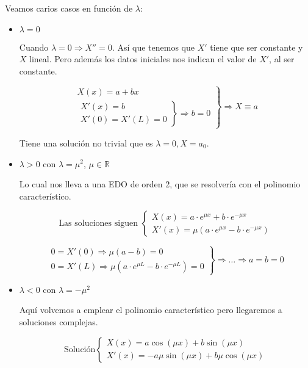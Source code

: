 \begin{example}
		Veamos carios casos en función de $\lambda$:

		\begin{itemize}
			\item $\lambda = 0$

				Cuando $\lambda = 0 \Rightarrow X'' = 0$. Así que tenemos que $X'$ tiene que ser constante y $X$ lineal. Pero además los datos iniciales nos indican el valor de $X'$, al ser constante.

				\[ \left.
				\begin{array}{l}
					X(x) = a + bx \\
					\left.
					\begin{array}{r}
						X'(x) = b \\
						X'(0) = X'(L) = 0
					\end{array} \right\} \Rightarrow b = 0
				\end{array} \right\} \Rightarrow X \equiv a \]

				Tiene una solución no trivial que es $\lambda = 0, X=a_0$.

			\item $\lambda > 0$ con $\lambda = \mu^2$, $\mu \in \mathbb{R}$

				Lo cual nos lleva a una EDO de orden 2, que se resolvería con el polinomio característico.

				\[ \text{Las soluciones siguen } \left\{
				   \begin{array}{l}
				   	X(x) = a \cdot e^{\mu x} + b \cdot e^{-\mu x} \\
				   	X'(x) = \mu (a\cdot e^{\mu x} - b\cdot e^{-\mu x})
				   \end{array} \right.
				\]

				\[ \left. \begin{array}{l}
					0 = X'(0) \Rightarrow \mu(a - b) = 0 \\
					0 = X'(L) \Rightarrow \mu(a \cdot e^{\mu L} - b \cdot e^{-\mu L}) = 0
				\end{array} \right\}
					\Rightarrow … \Rightarrow a = b = 0
				\]


			\item $\lambda < 0$ con $\lambda = - \mu^2$

				Aquí volvemos a emplear el polinomio característico pero llegaremos a soluciones complejas.

			 	\[ \text{Solución} \left\{
				   \begin{array}{l}
				   	X(x) = a \cos(\mu x ) + b \sin( \mu x) \\
				   	X'(x) = -a \mu \sin(\mu x) + b \mu \cos(\mu x)
				   \end{array} \right.
				\]


\end{itemize}
\end{example}
